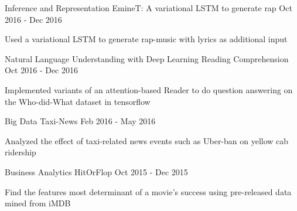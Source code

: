 \begin{cventries}
  \cventry
    {Inference and Representation}
    {EmineT: A variational LSTM to generate rap}
    {}
    {Oct 2016 -  Dec 2016}
    {
      \begin{cvitems}
        \item {Used a variational LSTM to generate rap-music with lyrics as additional input}
      \end{cvitems}
    }
  \cventry
    {Natural Language Understanding with Deep Learning}
    {Reading Comprehension}
    {}
    {Oct 2016 -  Dec 2016}
    {
      \begin{cvitems}
        \item {Implemented variants of an attention-based Reader to do question answering on the Who-did-What dataset in tensorflow}
      \end{cvitems}
    }
  \cventry
    {Big Data}
    {Taxi-News}
    {}
    {Feb 2016 - May 2016}
    {
      \begin{cvitems}
        \item {Analyzed the effect of taxi-related news events such as Uber-ban on yellow cab ridership}
      \end{cvitems}
    }
  \cventry
    {Business Analytics}
    {HitOrFlop}
    {}
    {Oct 2015 - Dec 2015}
    {
      \begin{cvitems}
        \item {Find the features most determinant of a movie's success using pre-released data mined from iMDB}
      \end{cvitems}
    }
\end{cventries}
